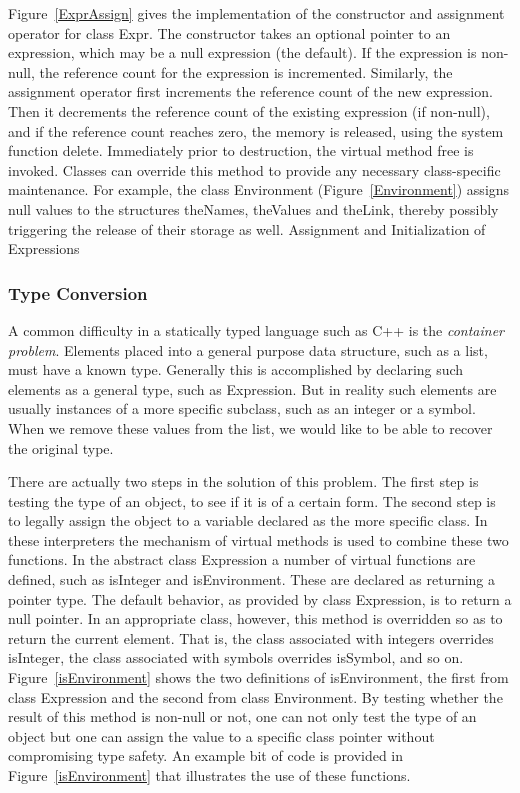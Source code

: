 Figure~\ref{ExprAssign} gives the implementation of the constructor and
assignment operator for class {\sf Expr}.  The constructor takes an optional
pointer to an expression, which may be a null expression (the default).  If the
expression is non-null, the reference count for the expression is incremented.
Similarly, the assignment operator first increments the reference count of the
new expression.  Then it decrements the reference count of the existing
expression (if non-null), and if the reference count reaches zero, the memory is
released, using the system function {\sf delete}.  Immediately prior to
destruction, the virtual method {\sf free} is invoked.  Classes can override
this method to provide any necessary class-specific maintenance.  For example,
the class {\sf Environment} (Figure~\ref{Environment}) assigns null values to
the structures {\sf theNames}, {\sf theValues} and {\sf theLink}, thereby
possibly triggering the release of their storage as well.
%
{Assignment and Initialization of Expressions}

\subsubsection{Type Conversion}

A common difficulty in a statically typed language such as C++ is the {\em
    container problem}.  Elements placed into a general purpose data structure,
such as a list, must have a known type.  Generally this is accomplished by
declaring such elements as a general type, such as {\sf Expression}.  But in
reality such elements are usually instances of a more specific subclass, such as
an integer or a symbol.  When we remove these values from the list, we would
like to be able to recover the original type.

There are actually two steps in the solution of this problem.  The first step is
testing the type of an object, to see if it is of a certain form.  The second
step is to legally assign the object to a variable declared as the more specific
class.  In these interpreters the mechanism of virtual methods is used to
combine these two functions.  In the abstract class {\sf Expression} a number of
virtual functions are defined, such as {\sf isInteger} and {\sf isEnvironment}.
These are declared as returning a pointer type.  The default behavior, as
provided by class {\sf Expression}, is to return a null pointer.  In an
appropriate class, however, this method is overridden so as to return the
current element.  That is, the class associated with integers overrides {\sf
    isInteger}, the class associated with symbols overrides {\sf isSymbol}, and
so on.  Figure~\ref{isEnvironment} shows the two definitions of {\sf
    isEnvironment}, the first from class {\sf Expression} and the second from
class {\sf Environment}.  By testing whether the result of this method is
non-null or not, one can not only test the type of an object but one can assign
the value to a specific class pointer without compromising type safety.  An
example bit of code is provided in Figure~\ref{isEnvironment} that illustrates
the use of these functions.

